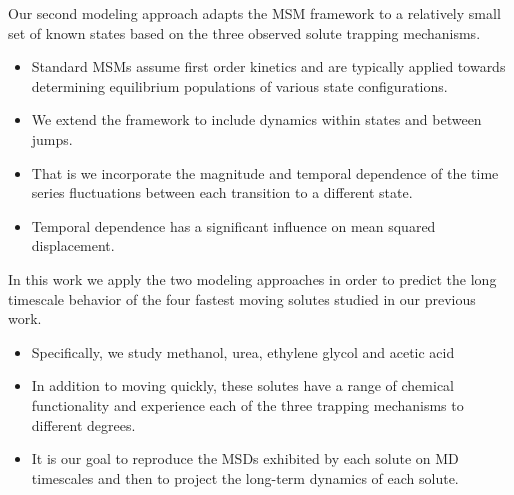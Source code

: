 \documentclass{article}
\begin{document}
  Our second modeling approach adapts the MSM framework to a relatively small set
  of known states based on the three observed solute trapping mechanisms.
  \begin{itemize}
    \item Standard MSMs assume first order kinetics and are typically applied 
    towards determining equilibrium populations of various state configurations.
    \item We extend the framework to include dynamics within states and
    between jumps. 
    \item That is we incorporate the magnitude and temporal dependence of the 
    time series fluctuations between each transition to a different state. 
    \item Temporal dependence has a significant influence on mean squared displacement.
  \end{itemize}
  
  In this work we apply the two modeling approaches in order to predict the long
  timescale behavior of the four fastest moving solutes studied in our previous work.
  \begin{itemize}
    \item Specifically, we study methanol, urea, ethylene glycol and acetic acid
    \item In addition to moving quickly, these solutes have a range of chemical
    functionality and experience each of the three trapping mechanisms to different
    degrees.
    \item It is our goal to reproduce the MSDs exhibited by each solute on MD timescales
    and then to project the long-term dynamics of each solute. 
  \end{itemize}

\end{document}
